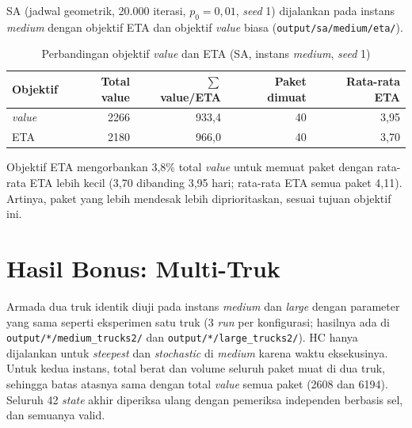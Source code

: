 SA (jadwal geometrik, 20.000 iterasi, $p_0=0{,}01$, \textit{seed} 1) dijalankan pada
instans \textit{medium} dengan objektif ETA dan objektif \textit{value} biasa
(\texttt{output/sa/medium/eta/}).

\begin{table}[H]
	\centering
	\caption{Perbandingan objektif \textit{value} dan ETA (SA, instans \textit{medium}, \textit{seed} 1)}
	\label{tab:eta}
	\begin{tabular}{l r r r r}
		\toprule
		\textbf{Objektif} & \textbf{Total value} & $\sum$ \textbf{value/ETA} & \textbf{Paket dimuat} & \textbf{Rata-rata ETA} \\
		\midrule
		\textit{value} & 2266 & 933,4 & 40 & 3,95 \\
		ETA & 2180 & 966,0 & 40 & 3,70 \\
		\bottomrule
	\end{tabular}
\end{table}

Objektif ETA mengorbankan 3,8\% total \textit{value} untuk memuat paket dengan rata-rata
ETA lebih kecil (3,70 dibanding 3,95 hari; rata-rata ETA semua paket 4,11). Artinya,
paket yang lebih mendesak lebih diprioritaskan, sesuai tujuan objektif ini.

\section{Hasil Bonus: Multi-Truk}
\label{sec:multitruck-hasil}

Armada dua truk identik diuji pada instans \textit{medium} dan \textit{large} dengan
parameter yang sama seperti eksperimen satu truk (3 \textit{run} per konfigurasi;
hasilnya ada di \texttt{output/*/medium\_trucks2/} dan \texttt{output/*/large\_trucks2/}).
HC hanya dijalankan untuk \textit{steepest} dan \textit{stochastic} di \textit{medium}
karena waktu eksekusinya. Untuk kedua instans, total berat dan volume seluruh paket
muat di dua truk, sehingga batas atasnya sama dengan total \textit{value} semua paket
(2608 dan 6194). Seluruh 42 \textit{state} akhir diperiksa ulang dengan pemeriksa
independen berbasis sel, dan semuanya valid.

